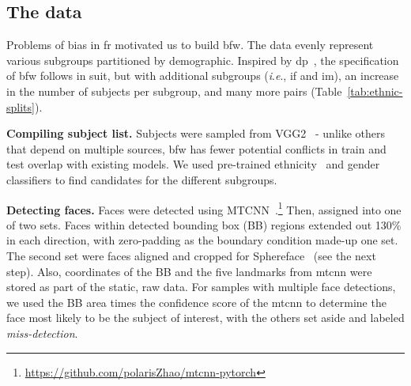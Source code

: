 \documentclass[10pt,twocolumn,letterpaper]{article}
\newcommand{\ie}{\textit{i}.\textit{e}., }
\begin{document}
\subsection{The data}
Problems of bias in \gls{fr} motivated us to build \gls{bfw}. The data evenly represent various subgroups partitioned by demographic. Inspired by \gls{dp}~\cite{demogPairs}, the specification of \gls{bfw} follows in suit, but with additional subgroups (\ie \gls{if} and \gls{im}), an increase in the number of subjects per subgroup, and many more pairs (Table~\ref{tab:ethnic-splits}). 




\vspace{1mm}
\noindent\textbf{Compiling subject list.} 
Subjects were sampled from VGG2~\cite{Cao18} - unlike others that depend on multiple sources, \gls{bfw} has fewer potential conflicts in train and test overlap with existing models. We used pre-trained ethnicity~\cite{ambekar2009name} and gender~\cite{levi2015age} classifiers to find candidates for the different subgroups.



\vspace{1mm}
\noindent\textbf{Detecting faces.} Faces were detected using MTCNN~\cite{zhang2016joint}.\footnote{\href{https://github.com/polarisZhao/mtcnn-pytorch}{https://github.com/polarisZhao/mtcnn-pytorch}} Then, assigned into one of two sets. Faces within detected bounding box (BB) regions extended out 130\% in each direction, with zero-padding as the boundary condition made-up one set. The second set were faces aligned and cropped for Sphereface~\cite{liu2017sphereface} (see the next step). Also, coordinates of the BB and the five landmarks from \gls{mtcnn} were stored as part of the static, raw data. For samples with multiple face detections, we used the BB area times the confidence score of the \gls{mtcnn} to determine the face most likely to be the subject of interest, with the others set aside and labeled \textit{miss-detection}. 
\end{document}
